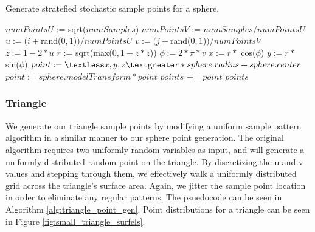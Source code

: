 \begin{algorithm}[H]
\captionfont
\caption[Sphere point generation]{Generate stratefied stochastic sample points for a sphere.}
\label{alg:sphere_point_gen}
{\fontsize{10}{9}\selectfont
\begin{algorithmic}
      \State $numPointsU$ := sqrt($numSamples$)
      \State $numPointsV$ := $numSamples / numPointsU$
            \State $u := (i + $rand($0,1$)$) / numPointsU$
            \State $v := (j + $rand($0,1$)$) / numPointsV$
            \State $z := 1 - 2*u$
            \State $r$ := sqrt(max($0, 1- z*z$))
            \State $\phi := 2 * \pi * v$
            \State $x := r *$ cos($\phi$)
            \State $y := r *$ sin($\phi$)
            \State $point := \textless x, y, z \textgreater * sphere.radius + sphere.center$
            \State $point := sphere.modelTransform * point$
            \State $points$ += $point$
         \EndFor
      \EndFor
      \State \Return $points$
   \EndFunction
\end{algorithmic}
}
\end{algorithm}

\subsubsection{Triangle}
\label{sec:triangle_point_gen}
We generate our triangle sample points by modifying a uniform sample pattern algorithm \cite{bib:pbr} in a similar manner to our sphere point generation.
The original algorithm requires two uniformly random variables as input, and will generate a uniformly distributed random point on the triangle.
By discretizing the u and v values and stepping through them, we effectively walk a uniformly distributed grid across the triangle's surface area.
Again, we jitter the sample point location in order to eliminate any regular patterns.
The psuedocode can be seen in Algorithm \ref{alg:triangle_point_gen}.
Point distributions for a triangle can be seen in Figure \ref{fig:small_triangle_surfels}.

